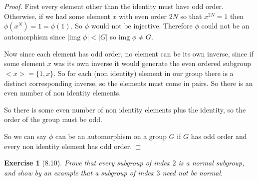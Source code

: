 \documentclass[12pt]{article}
\newtheorem*{exer}{Exercise}
\newcommand{\img}{\text{img }}
\begin{document}
\begin{proof}

    First every element other than the identity must have odd order.
    Otherwise, if we had some element $x$ with even order $2N$ so that
    $x^{2N} = 1$ then $\phi(x^N) = 1 = \phi(1)$. So $\phi$ would not be
    injective. Therefore $\phi$ could not be an automorphism since
    $|\img \phi | < |G|$ so $\img \phi \neq G$.

    Now since each element has odd order, no element can be its own
    inverse, since if some element $x$ was its own inverse it would
    generate the even ordered subgroup $<x> = \{1, x\}$. So for each
    (non identity) element in our group there is a distinct
    corresponding inverse, so the elements must come in pairs. So there
    is an even number of non identity elements.

    So there is some even number of non identity elements plus the
    identity, so the order of the group must be odd.

    So we can say $\phi$ can be an automorphism on a group $G$ if $G$
    has odd order and every non identity element has odd order.

\end{proof}


\begin{exer}[8.10]
Prove that every subgroup of index $2$ is a normal subgroup, and show by
an example that a subgroup of index $3$ need not be normal.
\end{exer}
\end{document}

